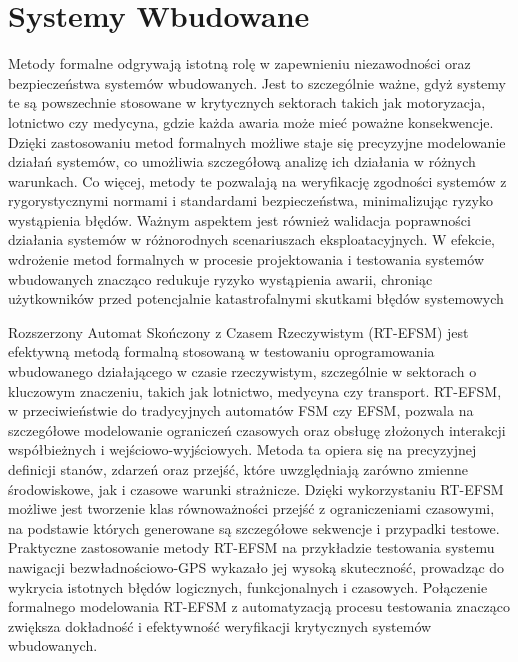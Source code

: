 \documentclass[conference]{IEEEtran}
\begin{document}
    \section{Systemy Wbudowane}
    
    Metody formalne odgrywają istotną rolę w zapewnieniu niezawodności oraz bezpieczeństwa systemów wbudowanych.
    Jest to szczególnie ważne, gdyż systemy te są powszechnie stosowane w krytycznych sektorach takich jak motoryzacja, lotnictwo czy medycyna,
    gdzie każda awaria może mieć poważne konsekwencje. Dzięki zastosowaniu metod formalnych możliwe staje się precyzyjne modelowanie działań  systemów,
    co umożliwia szczegółową analizę ich działania w różnych warunkach. Co więcej, metody te pozwalają na weryfikację zgodności systemów z rygorystycznymi normami i
    standardami bezpieczeństwa, minimalizując ryzyko wystąpienia błędów. Ważnym aspektem jest również walidacja poprawności działania systemów w różnorodnych scenariuszach eksploatacyjnych.
    W efekcie, wdrożenie metod formalnych w procesie projektowania i testowania systemów wbudowanych znacząco redukuje ryzyko wystąpienia awarii,
    chroniąc użytkowników przed potencjalnie katastrofalnymi skutkami błędów systemowych

    Rozszerzony Automat Skończony z Czasem Rzeczywistym (RT-EFSM) jest efektywną metodą formalną stosowaną w testowaniu oprogramowania wbudowanego działającego w czasie rzeczywistym, szczególnie w sektorach o kluczowym znaczeniu, takich jak lotnictwo, medycyna czy transport.
    RT-EFSM, w przeciwieństwie do tradycyjnych automatów FSM czy EFSM, pozwala na szczegółowe modelowanie ograniczeń czasowych oraz obsługę złożonych interakcji współbieżnych i 
    wejściowo-wyjściowych. Metoda ta opiera się na precyzyjnej definicji stanów, zdarzeń oraz przejść, które uwzględniają zarówno zmienne środowiskowe, 
    jak i czasowe warunki strażnicze. Dzięki wykorzystaniu RT-EFSM możliwe jest tworzenie klas równoważności przejść z ograniczeniami czasowymi,
    na podstawie których generowane są szczegółowe sekwencje i przypadki testowe. Praktyczne zastosowanie metody RT-EFSM na przykładzie testowania systemu nawigacji bezwładnościowo-GPS wykazało jej wysoką skuteczność,
    prowadząc do wykrycia istotnych błędów logicznych, funkcjonalnych i czasowych. Połączenie formalnego modelowania RT-EFSM z automatyzacją procesu testowania znacząco zwiększa dokładność i efektywność weryfikacji krytycznych systemów wbudowanych.
\end{document}
